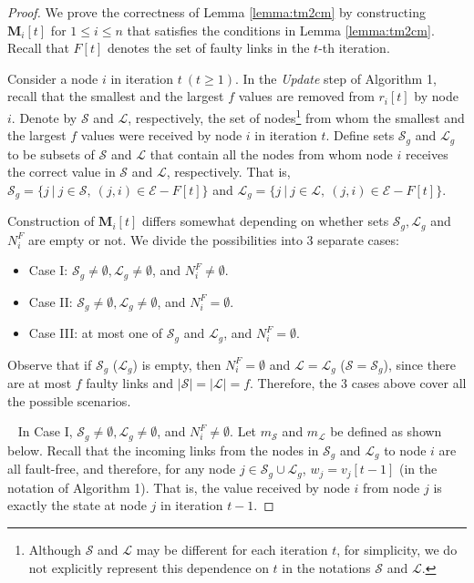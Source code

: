 \documentclass{llncs}
\newcommand{\scripte}{\mathcal{E}}
\newcommand{\scriptl}{\mathcal{L}}
\newcommand{\scripts}{\mathcal{S}}
\newcommand{\matrixm}{\textbf{M}}
\begin{document}
\begin{proof}

We prove the correctness of Lemma \ref{lemma:tm2cm} by constructing $\matrixm_i[t]$ for $1 \leq i \leq n$ that satisfies the conditions in Lemma \ref{lemma:tm2cm}. Recall that $F[t]$ denotes the set of faulty links in the $t$-th iteration.

Consider a node $i$ in iteration $t~(t \geq 1)$. In the {\em Update} step of Algorithm 1, recall that the smallest and the largest $f$ values are removed from $r_i[t]$ by node $i$. Denote by $\scripts$ and $\scriptl$, respectively, the set of nodes\footnote{Although $\scripts$ and $\scriptl$ may be different for each iteration $t$, for simplicity, we do not explicitly represent this dependence on $t$ in the notations $\scripts$ and $\scriptl$.} from whom the smallest and the largest $f$ values were received by node $i$ in iteration $t$. Define sets $\scripts_g$ and $\scriptl_g$ to be subsets of $\scripts$ and $\scriptl$ that contain all the nodes from whom node $i$ receives the correct value in $\scripts$ and $\scriptl$, respectively. That is, $\scripts_g = \{j~|~j \in \scripts,~(j,i) \in \scripte - F[t]\}$ and $\scriptl_g = \{j~|~j \in \scriptl,~(j,i) \in \scripte - F[t]\}$.

Construction of $\matrixm_i[t]$ differs somewhat depending on whether
sets $\scripts_g, \scriptl_g$ and $N_i^F$ are empty or not.
We divide the possibilities into 3 separate cases:

\begin{itemize}
\item Case I: $\scripts_g \neq \emptyset, \scriptl_g \neq \emptyset$, and $N_i^F \neq \emptyset$.

\item Case II: $\scripts_g \neq \emptyset, \scriptl_g \neq \emptyset$, and $N_i^F = \emptyset$.

\item Case III: at most one of $\scripts_g$ and $\scriptl_g$, and $N_i^F = \emptyset$.

\end{itemize}
Observe that if $\scripts_g$ ($\scriptl_g$) is empty, then $N_i^F = \emptyset$ and $\scriptl = \scriptl_g$ ($\scripts = \scripts_g$), since there are at most $f$ faulty links and $|\scripts| = |\scriptl| = f$. Therefore, the 3 cases above cover all the possible scenarios.



~
In Case I,
$\scripts_g \neq \emptyset, \scriptl_g \neq \emptyset$, and $N_i^F \neq \emptyset$. Let $m_{\scripts}$ and $m_{\scriptl}$ be defined as shown below. Recall that the incoming links from the nodes in $\scripts_g$ and $\scriptl_g$ to node $i$ are all fault-free, and therefore, for any node $j\in \scripts_g \cup \scriptl_g$, $w_j=v_j[t-1]$ (in the notation of Algorithm 1). That is, the value received by node $i$ from node $j$ is exactly the state at node $j$ in iteration $t-1$.


\end{proof}
\end{document}
